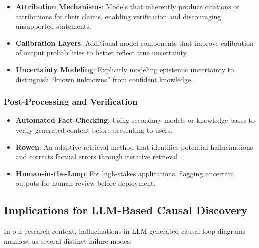 \begin{itemize}
    \item \textbf{Attribution Mechanisms}: Models that inherently produce citations or attributions for their claims, enabling verification and discouraging unsupported statements.
    
    \item \textbf{Calibration Layers}: Additional model components that improve calibration of output probabilities to better reflect true uncertainty.
    
    \item \textbf{Uncertainty Modeling}: Explicitly modeling epistemic uncertainty to distinguish ``known unknowns'' from confident knowledge.
\end{itemize}

\subsubsection{Post-Processing and Verification}

\begin{itemize}
    \item \textbf{Automated Fact-Checking}: Using secondary models or knowledge bases to verify generated content before presenting to users.
    
    \item \textbf{Rowen}: An adaptive retrieval method that identifies potential hallucinations and corrects factual errors through iterative retrieval \citep{rowen2024adaptive}.
    
    \item \textbf{Human-in-the-Loop}: For high-stakes applications, flagging uncertain outputs for human review before deployment.
\end{itemize}

\subsection{Implications for LLM-Based Causal Discovery}

In our research context, hallucinations in LLM-generated causal loop diagrams manifest as several distinct failure modes:


